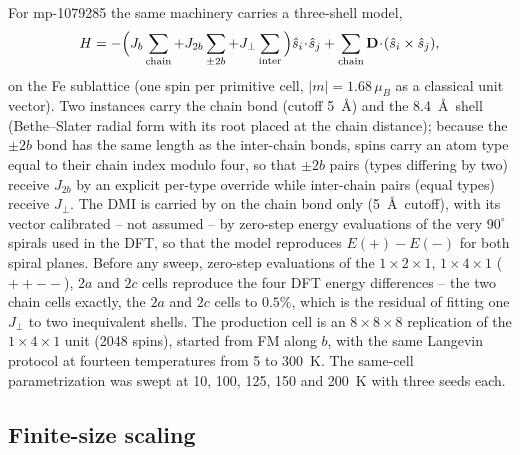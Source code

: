 \documentclass[aps,prb,preprint,superscriptaddress,longbibliography,nofootinbib]{revtex4-2}
\begin{document}
For mp-1079285 the same machinery carries a three-shell model,
\begin{equation}
H=-\Big(J_b\sum_{\rm chain}+J_{2b}\sum_{\pm2b}+J_\perp\sum_{\rm inter}\Big)\hat{s}_i\!\cdot\!\hat{s}_j
+\sum_{\rm chain}\mathbf{D}\!\cdot\!(\hat{s}_i\times\hat{s}_j),
\end{equation}
on the Fe sublattice (one spin per primitive cell, $|m|=1.68\,\mu_B$ as a classical unit vector). Two
 instances carry the chain bond (cutoff 5~\AA) and the 8.4~\AA\ shell (Bethe--Slater
radial form with its root placed at the chain distance); because the $\pm2b$ bond has the same length as the
inter-chain bonds, spins carry an atom type equal to their chain index modulo four, so that $\pm2b$ pairs
(types differing by two) receive $J_{2b}$ by an explicit per-type override while inter-chain pairs (equal
types) receive $J_\perp$. The DMI is carried by  on the chain bond only (5~\AA\ cutoff), with
its vector calibrated -- not assumed -- by zero-step energy evaluations of the very $90^\circ$ spirals used in
the DFT, so that the model reproduces $E(+)-E(-)$ for both spiral planes. Before any sweep, zero-step
evaluations of the $1\times2\times1$, $1\times4\times1$ ($++--$), $2a$ and $2c$ cells reproduce the four DFT
energy differences -- the two chain cells exactly, the $2a$ and $2c$ cells to $0.5$\%, which is the residual
of fitting one $J_\perp$ to two inequivalent shells. The production cell is an $8\times8\times8$ replication
of the $1\times4\times1$ unit (2048 spins), started from FM along $b$, with the same Langevin protocol at
fourteen temperatures from 5 to 300~K. The same-cell parametrization was swept at 10, 100, 125, 150
and 200~K with three seeds each.

\subsection*{Finite-size scaling}
\end{document}
